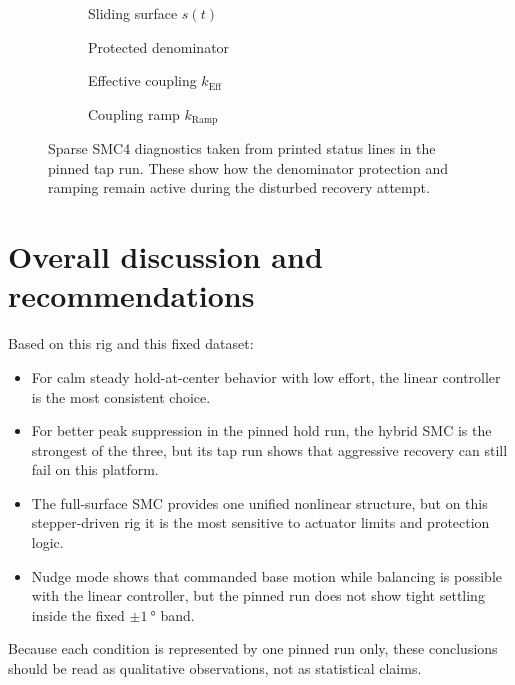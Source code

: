 \begin{figure}[htbp]
  \centering
  \begin{subfigure}[t]{0.48\linewidth}
    \centering
    \caption{Sliding surface $s(t)$}
  \end{subfigure}\hfill
  \begin{subfigure}[t]{0.48\linewidth}
    \centering
    \caption{Protected denominator}
  \end{subfigure}

  \medskip

  \begin{subfigure}[t]{0.48\linewidth}
    \centering
    \caption{Effective coupling $k_{\mathrm{Eff}}$}
  \end{subfigure}\hfill
  \begin{subfigure}[t]{0.48\linewidth}
    \centering
    \caption{Coupling ramp $k_{\mathrm{Ramp}}$}
  \end{subfigure}
  \caption{Sparse SMC4 diagnostics taken from printed status lines in the pinned tap run. These show how the denominator protection and ramping remain active during the disturbed recovery attempt.}
  \label{fig:tap_smc4_support}
\end{figure}
\clearpage

\section{Overall discussion and recommendations}
Based on this rig and this fixed dataset:
\begin{itemize}
  \item For calm steady hold-at-center behavior with low effort, the linear controller is the most consistent choice.
  \item For better peak suppression in the pinned hold run, the hybrid SMC is the strongest of the three, but its tap run shows that aggressive recovery can still fail on this platform.
  \item The full-surface SMC provides one unified nonlinear structure, but on this stepper-driven rig it is the most sensitive to actuator limits and protection logic.
  \item Nudge mode shows that commanded base motion while balancing is possible with the linear controller, but the pinned run does not show tight settling inside the fixed $\pm\SI{1}{\degree}$ band.
\end{itemize}
Because each condition is represented by one pinned run only, these conclusions should be read as qualitative observations, not as statistical claims.
